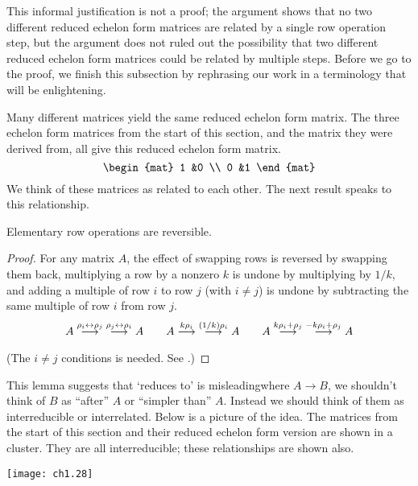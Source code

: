 This informal justification is not a proof;
the argument shows that no two different reduced echelon form matrices
are related by a single row operation step, but the argument does not
ruled out the possibility that two different reduced echelon form
matrices could be related by multiple steps.
Before we go to the proof, we finish this subsection by 
rephrasing our work in a terminology that will be enlightening.

Many different matrices yield the same reduced echelon
form matrix.
The three echelon form matrices from the start of this section, and
the matrix they were derived from, all give this reduced echelon form
matrix.
\begin{equation*}
  \begin{mat}
    1  &0  \\
    0  &1
  \end{mat}
\end{equation*}
We think of these matrices as related to each other.
The next result speaks to this relationship.

\begin{lemma} \label{le:RowOpsRev}
Elementary row operations are reversible.
\end{lemma}

\begin{proof}
For any matrix \( A \),
the effect of swapping rows is reversed by swapping them back,
multiplying a row by a nonzero \( k \) is undone by multiplying by
$1/k$,
and adding a multiple of row \( i \) to row \( j \) (with $i\neq j$)
is undone by subtracting the same multiple of row \( i \) from row \( j \).
\begin{equation*}
      A
     \mathrel{ \mathop{\longrightarrow}\limits^{\rho_i\leftrightarrow\rho_j\mathstrut}_{ \begin{subarray}{l} \relax \end{subarray}}}
     \;\mathrel{ \mathop{\longrightarrow}\limits^{\rho_j\leftrightarrow\rho_i\mathstrut}_{ \begin{subarray}{l} \relax \end{subarray}}}
      A
  \qquad
        A
     \mathrel{ \mathop{\longrightarrow}\limits^{k\rho_i\mathstrut}_{ \begin{subarray}{l} \relax \end{subarray}}}
     \;\mathrel{ \mathop{\longrightarrow}\limits^{(1/k)\rho_i\mathstrut}_{ \begin{subarray}{l} \relax \end{subarray}}}
      A
  \qquad
        A
     \mathrel{ \mathop{\longrightarrow}\limits^{k\rho_i+\rho_j\mathstrut}_{ \begin{subarray}{l} \relax \end{subarray}}}
     \;\mathrel{ \mathop{\longrightarrow}\limits^{-k\rho_i+\rho_j\mathstrut}_{ \begin{subarray}{l} \relax \end{subarray}}}
      A                          
\end{equation*}
(The $i\neq j$ conditions is needed.
See .)
\end{proof}

This lemma suggests that `reduces to' is misleading\Dash where
\( A\longrightarrow B \), we shouldn't think of \( B \) as
``after'' \( A \) or ``simpler than'' $A$.
Instead we should think of them as interreducible or interrelated.
Below is a picture of the idea.
The matrices from the start of this section and their
reduced echelon form version are shown in a cluster.
They are all interreducible;
these relationships are shown also. 
\begin{center}  
  \texttt{[image: ch1.28]}
\end{center}

